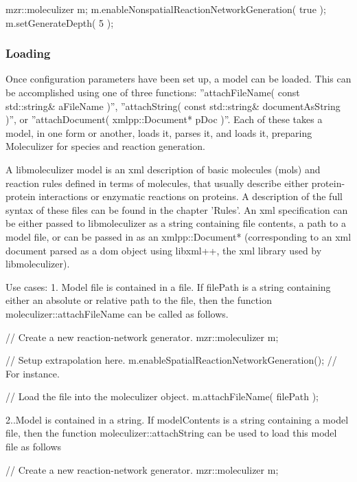 \begin{1st listing}
\begin{1stlisting}
  mzr::moleculizer m; 
  m.enableNonspatialReactionNetworkGeneration( true );
  m.setGenerateDepth( 5 );
\end{1stlisting}
  


\subsubsection{Loading}
Once configuration parameters have been set up, a model can be
loaded.  This can be accomplished using one of three functions:
''attachFileName( const std::string& aFileName )'',
''attachString( const std::string& documentAsString )'',
or ''attachDocument( xmlpp::Document* pDoc )''.  Each of these takes a
model, in one form or another, loads it, parses it, and loads it,
preparing Moleculizer for species and reaction generation.  

A libmoleculizer model is an xml description of basic molecules (mols) and
reaction rules defined in terms of molecules, that usually describe
either protein-protein interactions or enzymatic reactions on
proteins.  A description of the full syntax of these files can be
found in the chapter 'Rules'.  An xml specification can be either
passed to libmoleculizer as a string containing file contents, a path
to a model file, or can be passed in as an xmlpp::Document*
(corresponding to an xml document parsed as a dom object using
libxml++, the xml library used by libmoleculizer).

Use cases:
1.  Model file is contained in a file.
If filePath is a string containing either an absolute or relative path
to the file, then the function moleculizer::attachFileName can be
called as follows.  

\begin{1stlisting}
// Create a new reaction-network generator.
mzr::moleculizer m;

// Setup extrapolation here. 
m.enableSpatialReactionNetworkGeneration(); // For instance.

// Load the file into the moleculizer object.
m.attachFileName( filePath );
\end{1stlisting}

2..Model is contained in a string.
If modelContents is a string containing a model file, then the
function moleculizer::attachString can be used to load this model file
as follows

// Create a new reaction-network generator.
mzr::moleculizer m; 


\end{1st listing}
